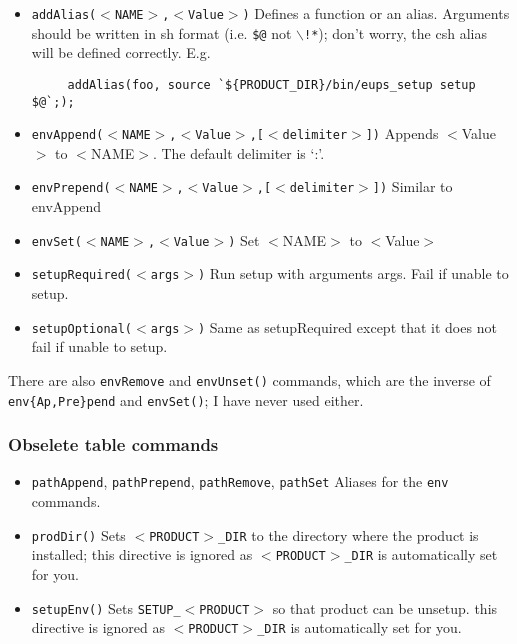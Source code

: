 \documentclass{article}
\newcommand{\code}[1]{\texttt{#1}}
\begin{document}
\begin{itemize}
   \item \code{addAlias($<$NAME$>$,$<$Value$>$)}
     Defines a function or an alias.  Arguments should be written in
     sh format (i.e. \code{\$@} not \code{$\backslash$!*}); don't worry,
     the csh alias will be defined correctly.  E.g.
     \begin{verbatim}
     addAlias(foo, source `${PRODUCT_DIR}/bin/eups_setup setup $@`;);
     \end{verbatim}
    
   \item \code{envAppend($<$NAME$>$,$<$Value$>$,[$<$delimiter$>$])}
     Appends $<$Value$>$ to $<$NAME$>$. The default delimiter is `:'.
     
   \item \code{envPrepend($<$NAME$>$,$<$Value$>$,[$<$delimiter$>$])}
     Similar to envAppend
     
   \item \code{envSet($<$NAME$>$,$<$Value$>$)}
     Set $<$NAME$>$ to $<$Value$>$
     
   \item \code{setupRequired($<$args$>$)}
     Run setup with arguments args. Fail if unable to setup.
     
   \item \code{setupOptional($<$args$>$)}
     Same as setupRequired except that it does not fail if unable to setup.
\end{itemize}

There are also \code{envRemove} and \code{envUnset()} commands, which
are the inverse of \code{env\{Ap,Pre\}pend} and \code{envSet()}; I have
never used either.     

\subsubsection{Obselete table commands}

\begin{itemize}
   \item \code{pathAppend}, \code{pathPrepend}, \code{pathRemove}, \code{pathSet}
     Aliases for the \code{env} commands.
     
   \item \code{prodDir()}
     Sets \code{$<$PRODUCT$>$\_DIR} to the directory where the product is installed;
     this directive is ignored as \code{$<$PRODUCT$>$\_DIR} is automatically set for you.
     
   \item \code{setupEnv()}
     Sets \code{SETUP\_$<$PRODUCT$>$} so that product can be unsetup.
     this directive is ignored as \code{$<$PRODUCT$>$\_DIR} is automatically set for you.
\end{itemize}
        
\end{document}
